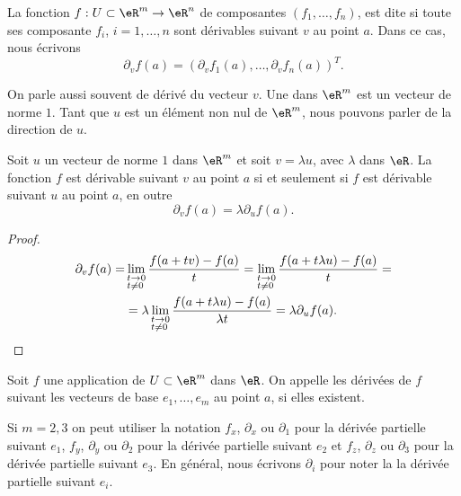 \begin{definition}
  La fonction $f:U\subset\eR^m\to \eR^n$ de composantes $(f_1,\ldots, f_n)$, est dite  si toute ses composante $f_i$, $i=1,\ldots, n$ sont dérivables suivant $v$ au point $a$. Dans ce cas, nous écrivons
  \begin{equation}
	\partial_v f(a)=\left(\partial_v f_1(a), \ldots, \partial_v f_n(a)\right)^T.
  \end{equation}
\end{definition}
On parle aussi souvent de dérivé  du vecteur $v$. Une  dans $\eR^m$ est un vecteur de norme $1$. Tant que $u$ est un élément non nul de $\eR^m$, nous pouvons parler de la direction de $u$.

\begin{proposition}
Soit $u$ un vecteur de norme $1$ dans $\eR^m$ et soit $v=\lambda u$, avec $\lambda$ dans $\eR$. La fonction $f$ est dérivable suivant $v$ au point $a$ si et seulement si $f$ est dérivable suivant $u$ au point $a$, en outre  
\[
\partial_v f(a)=\lambda\partial_u f(a).
\]
\end{proposition}
\begin{proof}
  \begin{equation}
    \begin{aligned}
  \partial_v f(a)=&\lim_{\begin{subarray}{l}
     t\to 0\\ t\neq 0 
    \end{subarray}}\frac{f(a+tv)-f(a)}{t}=\lim_{\begin{subarray}{l}
     t\to 0\\ t\neq 0 
    \end{subarray}}\frac{f(a+t\lambda u)-f(a)}{t}=\\
&=\lambda \lim_{\begin{subarray}{l}
    t\to 0\\ t\neq 0 
  \end{subarray}}\frac{f(a+t\lambda u)-f(a)}{\lambda t}=\lambda \partial_u f(a).    
    \end{aligned}
  \end{equation}
\end{proof}
\begin{definition}
Soit $f$ une application de $U\subset\eR^m$ dans $\eR$. On appelle  les dérivées de $f$ suivant les vecteurs de base $e_1,\ldots,e_m $ au point $a$, si elles existent.
\end{definition}
Si $m=2,3$ on peut utiliser la notation $f_x$, $\partial_x$  ou $\partial_1$ pour la dérivée partielle suivant $e_1$, $f_y$, $\partial_y$  ou $\partial_2$  pour la dérivée partielle suivant $e_2$ et $f_z$,  $\partial_z$  ou $\partial_3$  pour la dérivée partielle suivant $e_3$. En général, nous écrivons $\partial_i$ pour noter la la dérivée partielle suivant $e_i$.  


